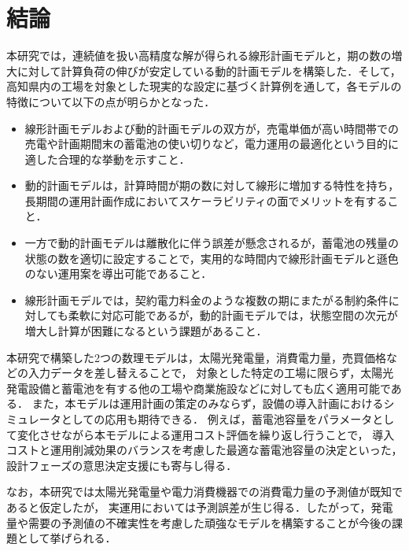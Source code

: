 
\chapter{結論}
本研究では，連続値を扱い高精度な解が得られる線形計画モデルと，期の数の増大に対して計算負荷の伸びが安定している動的計画モデルを構築した．そして，高知県内の工場を対象とした現実的な設定に基づく計算例を通して，各モデルの特徴について以下の点が明らかとなった．
\begin{itemize}
    \item 線形計画モデルおよび動的計画モデルの双方が，売電単価が高い時間帯での売電や計画期間末の蓄電池の使い切りなど，電力運用の最適化という目的に適した合理的な挙動を示すこと．
    \item 動的計画モデルは，計算時間が期の数に対して線形に増加する特性を持ち，長期間の運用計画作成においてスケーラビリティの面でメリットを有すること．
    \item 一方で動的計画モデルは離散化に伴う誤差が懸念されるが，蓄電池の残量の状態の数を適切に設定することで，実用的な時間内で線形計画モデルと遜色のない運用案を導出可能であること．
    \item 線形計画モデルでは，契約電力料金のような複数の期にまたがる制約条件に対しても柔軟に対応可能であるが，動的計画モデルでは，状態空間の次元が増大し計算が困難になるという課題があること．
\end{itemize}

本研究で構築した2つの数理モデルは，太陽光発電量，消費電力量，売買価格などの入力データを差し替えることで，
対象とした特定の工場に限らず，太陽光発電設備と蓄電池を有する他の工場や商業施設などに対しても広く適用可能である．
また，本モデルは運用計画の策定のみならず，設備の導入計画におけるシミュレータとしての応用も期待できる．
例えば，蓄電池容量をパラメータとして変化させながら本モデルによる運用コスト評価を繰り返し行うことで，
導入コストと運用削減効果のバランスを考慮した最適な蓄電池容量の決定といった，設計フェーズの意思決定支援にも寄与し得る．

なお，本研究では太陽光発電量や電力消費機器での消費電力量の予測値が既知であると仮定したが，
実運用においては予測誤差が生じ得る．したがって，発電量や需要の予測値の不確実性を考慮した頑強なモデルを構築することが今後の課題として挙げられる．